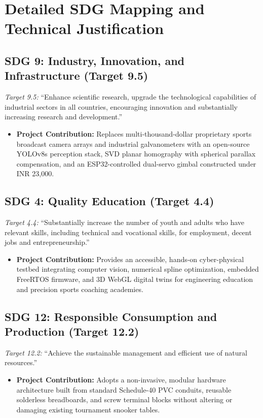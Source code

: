 \section{Detailed SDG Mapping and Technical Justification}

\subsection{SDG 9: Industry, Innovation, and Infrastructure (Target 9.5)}
\textit{Target 9.5:} ``Enhance scientific research, upgrade the technological capabilities of industrial sectors in all countries, encouraging innovation and substantially increasing research and development.''
\begin{itemize}
    \item \textbf{Project Contribution:} Replaces multi-thousand-dollar proprietary sports broadcast camera arrays and industrial galvanometers with an open-source YOLOv8s perception stack, SVD planar homography with spherical parallax compensation, and an ESP32-controlled dual-servo gimbal constructed under INR 23,000.
\end{itemize}

\subsection{SDG 4: Quality Education (Target 4.4)}
\textit{Target 4.4:} ``Substantially increase the number of youth and adults who have relevant skills, including technical and vocational skills, for employment, decent jobs and entrepreneurship.''
\begin{itemize}
    \item \textbf{Project Contribution:} Provides an accessible, hands-on cyber-physical testbed integrating computer vision, numerical spline optimization, embedded FreeRTOS firmware, and 3D WebGL digital twins for engineering education and precision sports coaching academies.
\end{itemize}

\subsection{SDG 12: Responsible Consumption and Production (Target 12.2)}
\textit{Target 12.2:} ``Achieve the sustainable management and efficient use of natural resources.''
\begin{itemize}
    \item \textbf{Project Contribution:} Adopts a non-invasive, modular hardware architecture built from standard Schedule-40 PVC conduits, reusable solderless breadboards, and screw terminal blocks without altering or damaging existing tournament snooker tables.
\end{itemize}

